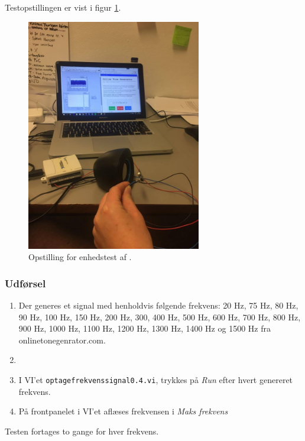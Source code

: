 		Testopstillingen er vist i figur \ref{fig:usbhojop}.\\
		
		\begin{figure}
			\centering
			\includegraphics[width=3in]{usbhojop.jpg}
			\caption{Opstilling for enhedstest af \elektretto.}
			\label{fig:usbhojop}
		\end{figure}
	
		\subsubsection{Udførsel}
			\begin{enumerate} 
				\item Der generes et signal med henholdvis følgende frekvens: 20 Hz, 75 Hz, 80 Hz, 90 Hz, 100 Hz, 150 Hz, 200 Hz, 300, 400 Hz, 500 Hz, 600 Hz, 700 Hz, 800 Hz, 900 Hz, 1000 Hz, 1100 Hz, 1200 Hz, 1300 Hz, 1400 Hz og 1500 Hz fra onlinetonegenrator.com.
				\item \item I VI'et \texttt{optagefrekvenssignal0.4.vi}, trykkes på \textit{Run} efter hvert genereret frekvens.  
				\item På frontpanelet i VI'et aflæses frekvensen i \textit{Maks frekvens}
			\end{enumerate}
			
			Testen fortages to gange for hver frekvens.  
		
